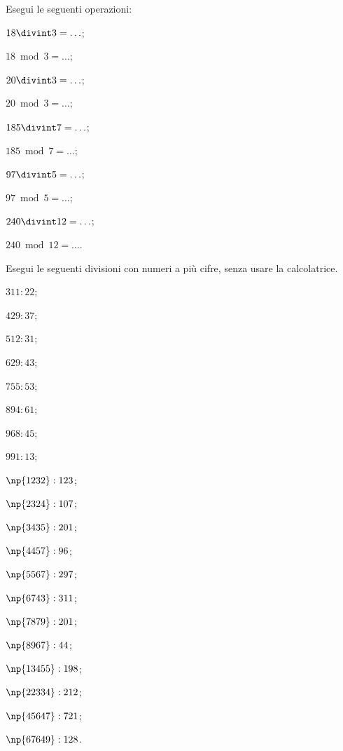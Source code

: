\begin{esercizio}
\label{ese:1.6}
 Esegui le seguenti operazioni:
\begin{multicols}{2}
 \begin{enumeratea}
 \item $18\divint 3=\ldots$;
 \item $18\bmod 3=\ldots$;
 \item $20\divint 3=\ldots$;
 \item $20\bmod 3=\ldots$;
 \item $185\divint 7=\ldots$;
 \item $185\bmod 7=\ldots$;
 \item $97\divint 5=\ldots$;
 \item $97\bmod 5=\ldots$;
 \item $240\divint 12=\ldots$;
 \item $240\bmod 12=\ldots$.
 \end{enumeratea}
\end{multicols}
\end{esercizio}

\pagebreak
\begin{esercizio}
\label{ese:1.7}
 Esegui le seguenti divisioni con numeri a più cifre, senza usare la calcolatrice.
\begin{multicols}{4}
 \begin{enumeratea}
 \item $311:22$;
 \item $429:37$;
 \item $512:31$;
 \item $629:43$;
 \item $755:53$;
 \item $894:61$;
 \item $968:45$;
 \item $991:13$;
 \item $\np{1232}:123$;
 \item $\np{2324}:107$;
 \item $\np{3435}:201$;
 \item $\np{4457}:96$;
 \item $\np{5567}:297$;
 \item $\np{6743}:311$;
 \item $\np{7879}:201$;
 \item $\np{8967}:44$;
 \item $\np{13455}:198$;
 \item $\np{22334}:212$;
 \item $\np{45647}:721$;
 \item $\np{67649}:128$.
 \end{enumeratea}
\end{multicols}
\end{esercizio}


